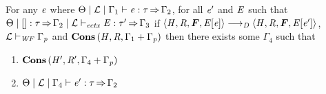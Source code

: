 \documentclass[runningheads]{llncs}
\begin{document}
\begin{lemma}[Preservation]
  For any $\mathit{e}$ where $ \Theta   \mid   \mathcal{L}   \mid   \Gamma_{{\mathrm{1}}}   \vdash   \mathit{e}  :  \tau   \operatorname{\Rightarrow}   \Gamma_{{\mathrm{2}}} $,
  for all $\mathit{e'}$ and $\mathit{E}$ such that
  $\Theta  \mid  []  :  \tau  \operatorname{\Rightarrow}  \Gamma_{{\mathrm{2}}}  \mid  \mathcal{L}  \vdash_{\mathit{ectx} }  \mathit{E}  :  \tau'  \operatorname{\Rightarrow}  \Gamma_{{\mathrm{3}}}$ if
  $  \tuple{ \ottnt{H} ,  \ottnt{R} ,  \oldvec{F} ,  \ottnt{E}  \ottsym{[}  \ottnt{e}  \ottsym{]} }     \longrightarrow _{ \ottnt{D} }     \tuple{ \ottnt{H} ,  \ottnt{R} ,  \oldvec{F} ,  \ottnt{E}  \ottsym{[}  \ottnt{e'}  \ottsym{]} }  $, $ \mathcal{L}   \vdash _{\mathit{WF}}  \Gamma_{\mathit{p}} $ and
  $\mathbf{Cons} \, (  \mathit{H}  ,  \mathit{R}  ,  \Gamma_{{\mathrm{1}}}  +  \Gamma_{\mathit{p}}  )$ then there exists some $\Gamma_{{\mathrm{4}}}$ such that
  \begin{enumerate}
  \item $\mathbf{Cons} \, (  \mathit{H'}  ,  \mathit{R'}  ,  \Gamma_{{\mathrm{4}}}  +  \Gamma_{\mathit{p}}  )$
  \item $ \Theta   \mid   \mathcal{L}   \mid   \Gamma_{{\mathrm{4}}}   \vdash   \mathit{e'}  :  \tau   \operatorname{\Rightarrow}   \Gamma_{{\mathrm{2}}} $
  \end{enumerate}
\end{lemma}
\end{document}
